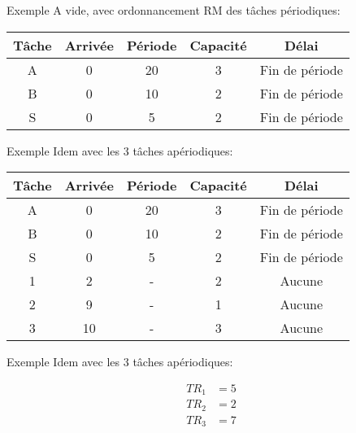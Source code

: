 \begin{frame}{Exemple}
  A vide, avec ordonnancement RM des tâches périodiques:
  \begin{center}
    \begin{tabular}{ccccc}
      \hline
      Tâche & Arrivée & Période & Capacité & Délai \\
      \hline
      A & 0 & 20 & 3 & Fin de période\\
      B & 0 & 10 & 2 & Fin de période\\
      S & 0 &  5 & 2 & Fin de période\\
      \hline
    \end{tabular}
    \pause
    
  \end{center}
\end{frame}

\begin{frame}{Exemple}
  Idem avec les 3 tâches apériodiques:
  \begin{center}
    \begin{tabular}{ccccc}
      \hline
      Tâche & Arrivée & Période & Capacité & Délai \\
      \hline
      A &  0 & 20 & 3 & Fin de période\\
      B &  0 & 10 & 2 & Fin de période\\
      S &  0 &  5 & 2 & Fin de période\\
      1 &  2 &  - & 2 & Aucune\\
      2 &  9 &  - & 1 & Aucune\\
      3 & 10 &  - & 3 & Aucune\\
      \hline
    \end{tabular}
    \pause
    
  \end{center}
\end{frame}

\begin{frame}{Exemple}
  Idem avec les 3 tâches apériodiques:
  \begin{center}
    
    \begin{align*}
      TR_1 &= 5\\
      TR_2 &= 2\\
      TR_3 &= 7\\
    \end{align*}
  \end{center}
\end{frame}

